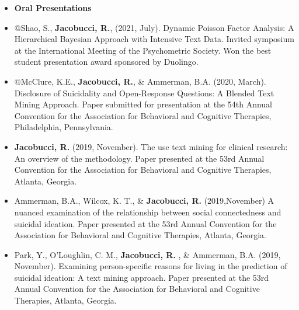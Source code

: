 \documentclass[letterpaper,10pt]{article}
\begin{document}
\begin{itemize}
	\item {\textbf{\large{Oral Presentations}}}
	\item[] $@$Shao, S., \textbf{Jacobucci, R.}, (2021, July). Dynamic Poisson Factor Analysis: A Hierarchical Bayesian Approach with Intensive Text Data. Invited symposium at the International Meeting of the Psychometric Society. Won the best student presentation award sponsored by Duolingo.
	\item[] $@$McClure, K.E., \textbf{Jacobucci, R.}, \& Ammerman, B.A. (2020, March). Disclosure of Suicidality and Open-Response Questions: A Blended Text Mining Approach. Paper submitted for presentation at the 54th Annual Convention for the Association for Behavioral and Cognitive Therapies, Philadelphia, Pennsylvania.
	\item[] \textbf{Jacobucci, R.} (2019, November). The use text mining for clinical research: An overview of the methodology. Paper presented at the 53rd Annual Convention for the Association for Behavioral and Cognitive Therapies, Atlanta, Georgia.
	\item[] Ammerman, B.A., Wilcox, K. T., \& \textbf{Jacobucci, R.} (2019,November) A nuanced examination of the relationship between social connectedness and suicidal ideation. Paper presented at the 53rd Annual Convention for the Association for Behavioral and Cognitive Therapies, Atlanta, Georgia.
	
	\item[] Park, Y., O'Loughlin, C. M., \textbf{Jacobucci, R.} , \& Ammerman, B.A. (2019, November). Examining person-specific reasons for living in the prediction of suicidal ideation: A text mining approach. Paper presented at the 53rd Annual Convention for the Association for Behavioral and Cognitive Therapies, Atlanta, Georgia.
	

\end{itemize}
\end{document}
